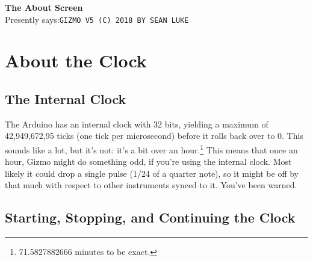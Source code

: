 \documentclass{article}
\begin{document}
\begin{description}
		
	\item{\bf The About Screen}\\
		Presently says:\quad \texttt{GIZMO V5 (C) 2018 BY SEAN LUKE}
	\end{description}

\clearpage
	\section{About the Clock}

	\subsection{The Internal Clock}
	\label{internalclock}

The Arduino has an internal clock with 32 bits, yielding a maximum of 42,949,672,95 ticks (one tick per microsecond) before it rolls back over to 0.  This sounds like a lot, but it's not: it's a bit over an hour.\footnote{71.5827882666 minutes to be exact.}  This means that once an hour, Gizmo might do something odd, if you're using the internal clock.  Most likely it could drop a single pulse (1/24 of a quarter note), so it might be off by that much with respect to other instruments synced to it.  You've been warned.

\subsection{Starting, Stopping, and Continuing the Clock }
	\label{startingclock}
\end{document}
